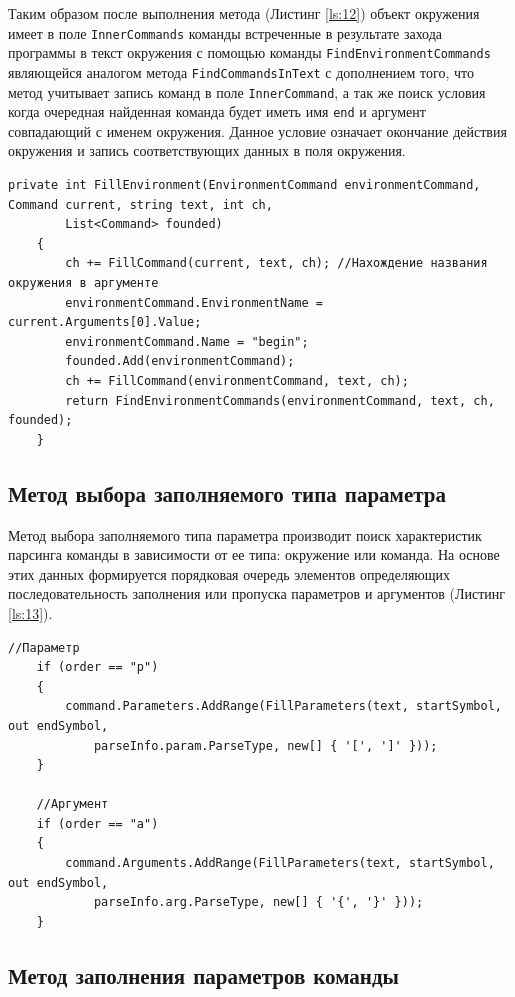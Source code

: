 Таким образом после выполнения метода (Листинг \ref{ls:12}) объект окружения имеет в поле \verb|InnerCommands| команды встреченные в результате захода программы в текст окружения с помощью команды \verb|FindEnvironmentCommands| являющейся аналогом метода \verb|FindCommandsInText| с дополнением того, что метод учитывает запись команд в поле \verb|InnerCommand|, а так же поиск условия когда очередная найденная команда будет иметь имя \verb|end| и аргумент совпадающий с именем окружения. Данное условие означает окончание действия окружения и запись соответствующих данных в поля окружения. 

\begin{lstlisting}[caption={}, label={ls:12}]
     private int FillEnvironment(EnvironmentCommand environmentCommand, Command current, string text, int ch,
        List<Command> founded)
    {
        ch += FillCommand(current, text, ch); //Нахождение названия окружения в аргументе
        environmentCommand.EnvironmentName = current.Arguments[0].Value;
        environmentCommand.Name = "begin";
        founded.Add(environmentCommand);
        ch += FillCommand(environmentCommand, text, ch);
        return FindEnvironmentCommands(environmentCommand, text, ch, founded);
    }
\end{lstlisting}

\subsection{Метод выбора заполняемого типа параметра}
Метод выбора заполняемого типа параметра производит поиск характеристик парсинга команды в зависимости от ее типа: окружение или команда. На основе этих данных формируется порядковая очередь элементов определяющих последовательность заполнения или пропуска параметров и аргументов (Листинг \ref{ls:13}).

\begin{lstlisting}[caption={Условие выбора типа заполняемого параметра}, label={ls:13}]
    //Параметр
    if (order == "p")
    {
        command.Parameters.AddRange(FillParameters(text, startSymbol, out endSymbol,
            parseInfo.param.ParseType, new[] { '[', ']' }));
    }

    //Аргумент
    if (order == "a")
    {
        command.Arguments.AddRange(FillParameters(text, startSymbol, out endSymbol,
            parseInfo.arg.ParseType, new[] { '{', '}' }));
    }
\end{lstlisting}

\subsection{Метод заполнения параметров команды}

